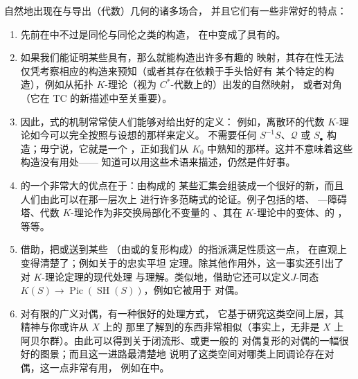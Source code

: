 \trInfinityCategories{}自然地出现在\trHomotopyTheory{}与导出（代数）几何的诸多场合，
并且它们有一些非常好的特点：
\begin{enumerate}[label=(\arabic*)]
  \item 先前在\trModelCategory{}中不过是同伦\trLimit{}与同伦\trColimit{}之类的构造，
在\trInfinityCategories{}中变成了具有\trUniversalProperty{}的\trObject{}。
  \item 如果我们能证明某些\trObject{}具有\trUniversalProperty{}，那么就能构造出许多有趣的%
映射，其存在性无法仅凭考察相应\trObject{}的构造来预知（或者其存在依赖于手头恰好有%
某个特定的构造），例如从拓扑 $K$-理论（视为 $C^*$-代数上的\trFunctor{}）出发的自然映射，
或者\trTate{}对角（它在 TC 的新描述中至关重要）。
  \item 因此，\trInfinityCategory{}式的机制常常使人们能够对\trObject{}给出好的定义：%
例如，离散环的代数 $K$-理论如今可以完全按照\trQuillen{}与\trSegal{}设想的那样来定义。
不需要任何 $S^{-1}S$、$\mathcal{Q}$ 或 $S_\bullet$ 构造；毋宁说，它就是一个%
\trGroupCompletion{}，正如我们从 $K_0$ 中熟知的那样。这并不意味着这些构造没有用处——%
知道\trGroupCompletion{}可以用这些术语来描述，仍然是件好事。
  \item \trInfinityCategories{}的一个非常大的优点在于：由\trInfinityCategories{}构成的%
某些汇集会组装成一个很好的新\trInfinityCategory{}，而且人们由此可以在那一层次上%
进行许多范畴式的论证。例子包括\trFunctor{}的\trGoodwillie{}塔、%
\trGoerss{}--\trHopkins{}--\trMiller{}障碍塔、代数 $K$-理论作为非交换局部化不变量的%
\trUniversalProperty{}、其在\trHermitian{} $K$-理论中的变体、\trSpectrum{}的%
\trSmashProduct{}，等等。
  \item 借助\trInfinityCategories{}，把\trTopologicalSpace{}或\trScheme{}送到某些%
\trCategories{}（由\trSheaf{}或\trSheaf{}的复形构成）的指派满足\trDescent{}性质这一点，
在直观上变得清楚了；例如\trGrothendieck{}关于\trDerivedCategory{}的忠实平坦%
\trDescent{}定理。除其他作用外，这一事实还引出了对 $K$-理论\trDescent{}定理的现代处理%
与理解。类似地，借助它还可以定义\trMotivic{}$J$-同态
$K(S) \to \operatorname{Pic}(\operatorname{SH}(S))$，例如它被用于%
\trMotivic{}\trAtiyah{}对偶。
  \item 对有限\trCWComplex{}的广义\trPoincare{}对偶，有一种很好的处理方式，%
它基于研究这类空间上\trLocallyConstant{}\trSpectrum{}层，其精神与你或许从 $X$ 上的%
\trLocalSystem{}那里了解到的东西非常相似（事实上，\trLocalSystem{}无非是 $X$ 上%
\trLocallyConstant{}阿贝尔群\trSheaf{}）。由此可以得到关于闭流形、或更一般的%
\trPoincare{}对偶复形的\trPoincare{}对偶的一幅很好的图景；而且这一进路最清楚地%
说明了这类空间对哪类上同调论存在\trPoincare{}对偶，这一点非常有用，%
例如在\trSurgeryTheory{}中。
\end{enumerate}

